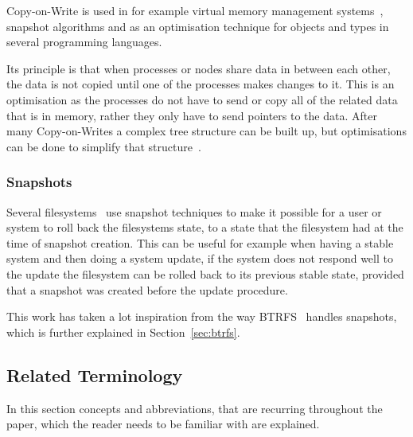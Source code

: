 \documentclass[a4paper,12pt]{article}
\begin{document}
Copy-on-Write is used in for example virtual memory management systems~\cite{VIRTCOW}, snapshot
algorithms and as an optimisation technique for objects and types in several programming
languages\cite{LANGCOW}.

Its principle is that when processes or nodes share data in between each other, the data is not
copied until one of the processes makes changes to it. This is an optimisation as the processes do
not have to send or copy all of the related data that is in memory, rather they only have to send
pointers to the data. After many Copy-on-Writes a complex tree structure can be built up, but
optimisations can be done to simplify that structure~\cite{COPYONWRITE2}.

\subsubsection{Snapshots}
Several filesystems~\cite{BTRFS}\cite{ZFS} use snapshot techniques to make it possible for a user
or system to roll back the filesystems state, to a state that the filesystem had at the time of
snapshot creation. This can be useful for example when having a stable system and then doing a
system update, if the system does not respond well to the update the filesystem can be rolled
back to its previous stable state, provided that a snapshot was created before the update procedure.

This work has taken a lot inspiration from the way BTRFS~\cite{BTRFS} handles snapshots, which is
further explained in Section~\ref{sec:btrfs}.

\newpage
\subsection{Related Terminology}
In this section concepts and abbreviations, that are recurring throughout the paper, which the
reader needs to be familiar with are explained.
\end{document}
